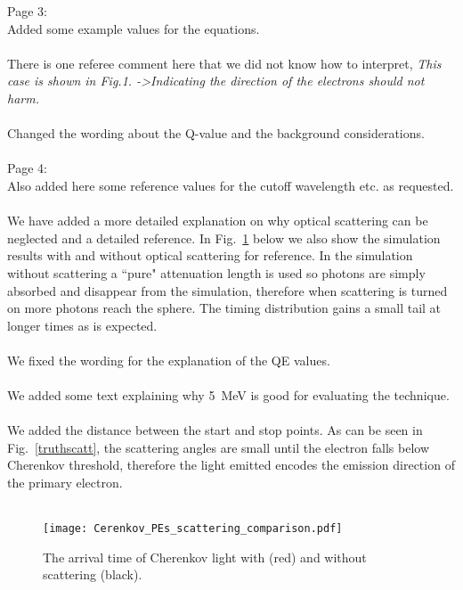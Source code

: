 \documentclass[11pt]{article}
\begin{document}
\noindent
Page 3: \\
Added some example values for the equations.\\ \\
There is one referee comment here that we did not know how to interpret, {\it This case is shown in Fig.1.
->Indicating the direction of the electrons should not harm.}\\ \\
Changed the wording about the Q-value and the background considerations. \\ \\


\noindent
Page 4: \\
Also added here some reference values for the cutoff wavelength etc. as requested. \\ \\
We have added a more detailed explanation on why optical scattering can be neglected and a detailed reference. In Fig.~\ref{scatt} below we also show the simulation results with and without optical scattering for reference. In the simulation without scattering a ``pure" attenuation length is used so photons are simply absorbed and disappear from the simulation, therefore when scattering is turned on more photons reach the sphere. The timing distribution gains a small tail at longer times as is expected.\\ \\
We fixed the wording for the explanation of the QE values.\\ \\
We added some text explaining why 5~MeV is good for evaluating the technique.\\ \\
We added the distance between the start and stop points. As can be seen in Fig.~\ref{truthscatt}, the scattering angles are small until the electron falls below Cherenkov threshold, therefore the light emitted encodes the emission direction of the primary electron.\\ \\


\begin{figure}
        \begin{center}
        \texttt{[image: Cerenkov\_PEs\_scattering\_comparison.pdf]} 
         \caption{The arrival time of Cherenkov light with (red) and without scattering (black).\label{scatt}}
        \end{center}
\end{figure}
\end{document}
